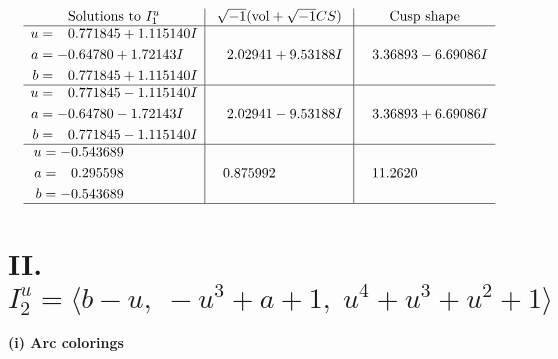 \documentclass[1p]{elsarticle_modified}
\theoremstyle{definition}
\newcommand{\I}{\sqrt{-1}}
\begin{document}
$$\begin{array}{c|c|c}  
\text{Solutions to }I^u_{1}& \I (\text{vol} + \sqrt{-1}CS) & \text{Cusp shape}\\
 \hline 
\begin{aligned}
u &= \phantom{-}0.771845 + 1.115140 I \\
a &= -0.64780 + 1.72143 I \\
b &= \phantom{-}0.771845 + 1.115140 I\end{aligned}
 & \phantom{-}2.02941 + 9.53188 I & \phantom{-}3.36893 - 6.69086 I \\ \hline\begin{aligned}
u &= \phantom{-}0.771845 - 1.115140 I \\
a &= -0.64780 - 1.72143 I \\
b &= \phantom{-}0.771845 - 1.115140 I\end{aligned}
 & \phantom{-}2.02941 - 9.53188 I & \phantom{-}3.36893 + 6.69086 I \\ \hline\begin{aligned}
u &= -0.543689\phantom{ +0.000000I} \\
a &= \phantom{-}0.295598\phantom{ +0.000000I} \\
b &= -0.543689\phantom{ +0.000000I}\end{aligned}
 & \phantom{-}0.875992\phantom{ +0.000000I} & \phantom{-}11.2620\phantom{ +0.000000I}\\
 \hline 
 \end{array}$$\newpage\newpage\renewcommand{\arraystretch}{1}
\centering \section*{II. $I^u_{2}= \langle b- u,\;- u^3+a+1,\;u^4+u^3+u^2+1 \rangle$}
\flushleft \textbf{(i) Arc colorings}\\
\end{document}
